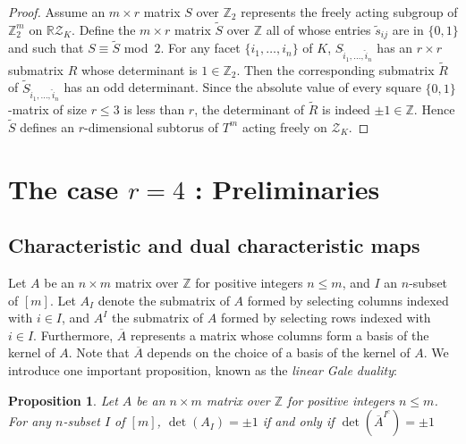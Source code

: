 \documentclass[11pt]{amsart}
\theoremstyle{plain}
\newtheorem{proposition}[theorem]{Proposition}
\numberwithin{equation}{section}
\theoremstyle{definition}
\newcommand{\R}{\mathbb{R}}
\newcommand{\Z}{\mathbb{Z}}
\newcommand{\cZ}{\mathcal{Z}}
\begin{document}
\begin{proof}
    Assume an $m \times r$ matrix $S$ over $\Z_2$ represents the freely acting subgroup of $\Z_2^m$ on $\R\cZ_K$.
    Define the $m \times r$ matrix $\tilde{S}$ over $\Z$ all of whose entries $\tilde{s}_{ij}$ are in $\{0, 1\}$ and such that $S \equiv \tilde{S}$ mod~$2$.
    For any facet $\{i_1, \ldots, i_n \}$ of $K$, $S_{\hat{i}_1, \ldots, \hat{i}_n}$ has an $r \times r$ submatrix $R$ whose determinant is $1 \in \Z_2$.
    Then the corresponding submatrix $\tilde{R}$ of $\tilde{S}_{\hat{i}_1, \ldots, \hat{i}_n}$ has an odd determinant.
    Since the absolute value of every square $\{0,1\}$-matrix of size $r \leq 3$ is less than $r$, the determinant of $\tilde{R}$ is indeed $\pm 1 \in \Z$.
    Hence $\tilde{S}$ defines an $r$-dimensional subtorus of $T^m$ acting freely on $\cZ_K$.
\end{proof}

\section{The case $r =4$ : Preliminaries}

\subsection{Characteristic and dual characteristic maps}
Let $A$ be an $n \times m$ matrix over $\Z$ for positive integers $n \leq m$, and $I$ an $n$-subset of $[m]$.
Let $A_I$ denote  the submatrix of $A$ formed by selecting columns indexed with $i \in I$, and $A^I$ the submatrix of $A$ formed by selecting rows indexed with $i \in I$.
Furthermore, $\overline{A}$ represents a matrix whose columns form a basis of the kernel of $A$.
Note that $\overline{A}$ depends on the choice of a basis of the kernel of $A$.
We introduce one important proposition, known as the \emph{linear Gale duality}:

\begin{proposition} \label{proposition: linear Gale duality}
    Let $A$ be an $n \times m$ matrix over $\Z$ for positive integers $n \leq m$.
    For any $n$-subset $I$ of $[m]$, $\det(A_I) = \pm 1$ if and only if $\det(\overline{A}^{I^c}) = \pm 1$
\end{proposition}
\end{document}
